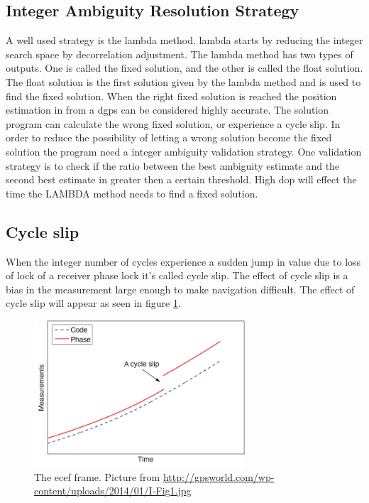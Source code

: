 \subsection{Integer Ambiguity Resolution Strategy}\label{ss:INtegerAM}
A well used strategy is the \gls{lambda} method. \gls{lambda} starts by reducing the integer search space by decorrelation adjustment. The \gls{lambda} method has two types of outputs. One is called the fixed solution, and the other is called the float solution. The float solution is the first solution given by the \gls{lambda} method and is used to find the fixed solution. When the right fixed solution is reached the position estimation in from a \gls{dgps} can be considered highly accurate. The solution program can calculate the wrong fixed solution, or experience a cycle slip. In order to reduce the possibility of letting a wrong solution become the fixed solution the program need a integer ambiguity validation strategy. One validation strategy is to check if the ratio between the best ambiguity estimate and the second best estimate in greater then a certain threshold. High \gls{dop} will effect the time the LAMBDA method needs to find a fixed solution.

\subsection{Cycle slip}\label{ss:cycleSlip}
When the integer number of cycles experience a sudden jump in value due to loss of lock of a receiver phase lock it's called cycle slip. The effect of cycle slip is a bias in the measurement large enough to make navigation difficult. The effect of cycle slip will appear as seen in figure \ref{figure:CycleSlip}.
\begin{figure}[H]
	\centering
		\includegraphics[width=0.7\textwidth]{figs/cycleSlip.jpg}
		\caption{The \gls{ecef} frame. Picture from \url{http://gpsworld.com/wp-content/uploads/2014/01/I-Fig1.jpg}}
		\label{figure:CycleSlip}
\end{figure}

